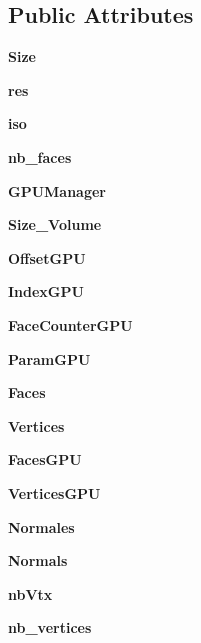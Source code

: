 \subsection*{Public Attributes}
\begin{DoxyCompactItemize}
\item 
\mbox{\label{class_my___marching_cube_1_1_my___marching_cube_afe2f5faf0ce2a333474f9d1496192f14}} 
{\bfseries Size}
\item 
\mbox{\label{class_my___marching_cube_1_1_my___marching_cube_a4ecd41f50f60bf712ad456a8fc941782}} 
{\bfseries res}
\item 
\mbox{\label{class_my___marching_cube_1_1_my___marching_cube_a3dcab76028b44472b20e598b7532a217}} 
{\bfseries iso}
\item 
\mbox{\label{class_my___marching_cube_1_1_my___marching_cube_a8a75f5324dfcfbd3fab050edd4006998}} 
{\bfseries nb\+\_\+faces}
\item 
\mbox{\label{class_my___marching_cube_1_1_my___marching_cube_a908d5321153e2341f710c047d95ad01a}} 
{\bfseries G\+P\+U\+Manager}
\item 
\mbox{\label{class_my___marching_cube_1_1_my___marching_cube_a328ca204253663c7dc82f6497796c63a}} 
{\bfseries Size\+\_\+\+Volume}
\item 
\mbox{\label{class_my___marching_cube_1_1_my___marching_cube_a896f6c74b604e6b2135845e8d17d3977}} 
{\bfseries Offset\+G\+PU}
\item 
\mbox{\label{class_my___marching_cube_1_1_my___marching_cube_a0fe61051ce01b62f304ae085ac9bfb3a}} 
{\bfseries Index\+G\+PU}
\item 
\mbox{\label{class_my___marching_cube_1_1_my___marching_cube_ab77b74495b2578c0a35c8ca3d3876de9}} 
{\bfseries Face\+Counter\+G\+PU}
\item 
\mbox{\label{class_my___marching_cube_1_1_my___marching_cube_a52820bb2f10966fb592ec7d62c108d54}} 
{\bfseries Param\+G\+PU}
\item 
\mbox{\label{class_my___marching_cube_1_1_my___marching_cube_aceb2a4ed570e10e042a44a29cad5ea95}} 
{\bfseries Faces}
\item 
\mbox{\label{class_my___marching_cube_1_1_my___marching_cube_a800426654b2cf0feb64d1bf212b34921}} 
{\bfseries Vertices}
\item 
\mbox{\label{class_my___marching_cube_1_1_my___marching_cube_afa52802741219118770c709e75446d5e}} 
{\bfseries Faces\+G\+PU}
\item 
\mbox{\label{class_my___marching_cube_1_1_my___marching_cube_ac3124bef4e245b03d3e66982aab263c9}} 
{\bfseries Vertices\+G\+PU}
\item 
\mbox{\label{class_my___marching_cube_1_1_my___marching_cube_a9699fa7abe4cae11215828c4e55e2805}} 
{\bfseries Normales}
\item 
\mbox{\label{class_my___marching_cube_1_1_my___marching_cube_a6470869842e5e29387ce307bde36c22c}} 
{\bfseries Normals}
\item 
\mbox{\label{class_my___marching_cube_1_1_my___marching_cube_a03cbb9a458d30723be59caaecbc5310b}} 
{\bfseries nb\+Vtx}
\item 
\mbox{\label{class_my___marching_cube_1_1_my___marching_cube_a81808a234dcc9b8a1d0f7fe737b747ec}} 
{\bfseries nb\+\_\+vertices}
\end{DoxyCompactItemize}
